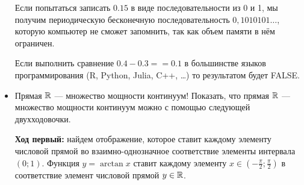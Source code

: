 \documentclass[12pt, a4paper]{article}
\begin{document}
\begin{itemize}
Если попытаться записать $0.15$ в виде последовательности из 0 и 1, мы получим периодическую бесконечную последовательность $0,1010101 \dots$, которую компьютер не сможет запомнить, так как объем памяти в нём ограничен.

Если выполнить сравнение $0.4 - 0.3 == 0.1$ в большинстве языков программирования (R, Python, Julia, C++, \ldots) то результатом будет FALSE.

\item Прямая $\mathbb R$ --- множество мощности континуум!
Показать, что прямая $\mathbb R$ --- множество мощности континуум можно с помощью следующей двухходовочки. 

\textbf{Ход первый:} найдем отображение, которое ставит каждому элементу числовой прямой во взаимно-однозначное соответствие элементы интервала $(0;1)$. Функция $y=\arctan x$ ставит каждому элементу $x \in (-\frac{\pi}{2};\frac{\pi}{2})$ в соответствие элемент числовой прямой $y \in \mathbb R$.   


\end{itemize}
\end{document}
